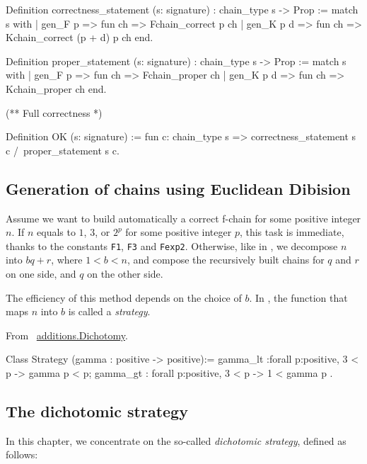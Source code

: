 \begin{Coqsrc}
Definition correctness_statement (s: signature) : 
chain_type s -> Prop :=
match s  with
  | gen_F p => fun ch => Fchain_correct p ch
  | gen_K p d   => fun ch => Kchain_correct (p + d) p ch
end.

Definition proper_statement (s: signature) : 
chain_type s -> Prop :=
match s  with
  | gen_F p => fun ch => Fchain_proper ch 
  | gen_K p d   => fun ch => Kchain_proper ch 
end.

(**  Full correctness *)

Definition  OK (s: signature) 
  := fun c: chain_type s => 
       correctness_statement s c /\
       proper_statement s c.

\end{Coqsrc}

\subsection{Generation of chains using Euclidean Dibision}

Assume we want to build automatically a correct  f-chain for some 
positive integer $n$.
If $n$ equals to $1$, $3$, or $2^p$ for some positive integer  $p$,
this task is immediate, thanks to the constants \texttt{F1}, 
\texttt{F3} and \texttt{Fexp2}.
Otherwise, like in \cite{DBLP:journals/ita/BrlekCHM95}, we decompose 
$n$ into $bq+r$, where $1<b<n$, and compose the recursively built
chains for $q$ and $r$ on one side, and $q$ on the other side.

The efficiency of this method depends on the choice of $b$.
In \cite{DBLP:journals/ita/BrlekCHM95}, the function that maps $n$ into $b$
is called a \emph{strategy}. 

\vspace{4pt}
\noindent
From ~\href{../theories/html/additions.Dichotomy.html}{additions.Dichotomy}.
\begin{Coqsrc}
Class Strategy (gamma : positive -> positive):=
{
gamma_lt :forall p:positive, 3 < p -> gamma  p < p;
gamma_gt : forall p:positive, 3 < p -> 1 < gamma  p
}.

\end{Coqsrc}
\subsection{The dichotomic strategy}


In this chapter, we concentrate
on the so-called \emph{dichotomic strategy}, defined as follows:

